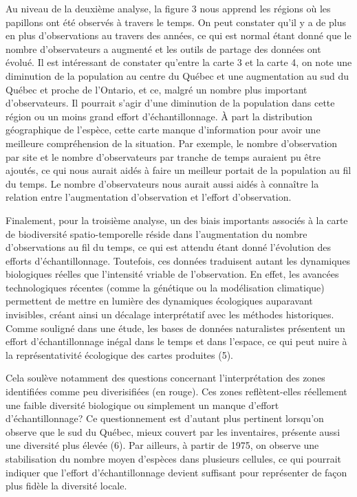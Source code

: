 \documentclass[9pt,twocolumn,twoside,]{pnas-new}
\begin{document}
Au niveau de la deuxième analyse, la figure 3 nous apprend les régions
où les papillons ont été observés à travers le temps. On peut constater
qu'il y a de plus en plus d'observations au travers des années, ce qui
est normal étant donné que le nombre d'observateurs a augmenté et les
outils de partage des données ont évolué. Il est intéressant de
constater qu'entre la carte 3 et la carte 4, on note une diminution de
la population au centre du Québec et une augmentation au sud du Québec
et proche de l'Ontario, et ce, malgré un nombre plus important
d'observateurs. Il pourrait s'agir d'une diminution de la population
dans cette région ou un moins grand effort d'échantillonnage. À part la
distribution géographique de l'espèce, cette carte manque d'information
pour avoir une meilleure compréhension de la situation. Par exemple, le
nombre d'observation par site et le nombre d'observateurs par tranche de
temps auraient pu être ajoutés, ce qui nous aurait aidés à faire un
meilleur portait de la population au fil du temps. Le nombre
d'observateurs nous aurait aussi aidés à connaître la relation entre
l'augmentation d'observation et l'effort d'observation.

Finalement, pour la troisième analyse, un des biais importants associés
à la carte de biodiversité spatio-temporelle réside dans l'augmentation
du nombre d'observations au fil du temps, ce qui est attendu étant donné
l'évolution des efforts d'échantillonnage. Toutefois, ces données
traduisent autant les dynamiques biologiques réelles que l'intensité
vriable de l'observation. En effet, les avancées technologiques récentes
(comme la génétique ou la modélisation climatique) permettent de mettre
en lumière des dynamiques écologiques auparavant invisibles, créant
ainsi un décalage interprétatif avec les méthodes historiques. Comme
souligné dans une étude, les bases de données naturalistes présentent un
effort d'échantillonnage inégal dans le temps et dans l'espace, ce qui
peut nuire à la représentativité écologique des cartes produites (5).

Cela soulève notamment des questions concernant l'interprétation des
zones identifiées comme peu diverisifiées (en rouge). Ces zones
reflètent-elles réellement une faible diversité biologique ou simplement
un manque d'effort d'échantillonnage? Ce questionnement est d'autant
plus pertinent lorsqu'on observe que le sud du Québec, mieux couvert par
les inventaires, présente aussi une diversité plus élevée (6). Par
ailleurs, à partir de 1975, on observe une stabilisation du nombre moyen
d'espèces dans plusieurs cellules, ce qui pourrait indiquer que l'effort
d'échantillonnage devient suffisant pour représenter de façon plus
fidèle la diversité locale.
\end{document}

